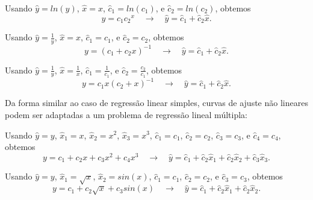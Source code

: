 \begin{example}%
Usando 
$\hat{y}=ln(y)$,  
$\hat{x}=x$, 
$\hat{c}_1=ln(c_1)$, e
$\hat{c}_2=ln(c_2)$, obtemos %
\begin{equation}
y=c_1 {c_2}^x
\quad \rightarrow \quad 
\hat{y}=\hat{c}_1+\hat{c}_2 \hat{x}.
\end{equation}
\vspace{-2pt}
\end{example}

\begin{example}%
Usando 
$\hat{y}=\frac{1}{y}$,  
$\hat{x}=x$, 
$\hat{c}_1=c_1$, e 
$\hat{c}_2=c_2$, obtemos %
\begin{equation}
y=\left(c_1 + {c_2} x \right)^{-1}
\quad \rightarrow \quad 
\hat{y}=\hat{c}_1+\hat{c}_2 \hat{x}.
\end{equation}
\vspace{-2pt}
\end{example}

\begin{example}%
Usando 
$\hat{y}=\frac{1}{y}$,  
$\hat{x}=\frac{1}{x}$, 
$\hat{c}_1=\frac{1}{c_1}$, e 
$\hat{c}_2=\frac{c_2}{c_1}$, obtemos %
\begin{equation}
y=c_1 x \left(c_2 + x\right)^{-1}
\quad \rightarrow \quad 
\hat{y}=\hat{c}_1+\hat{c}_2 \hat{x}.
\end{equation}
\vspace{-2pt}
\end{example}

Da forma similar ao caso de regressão linear simples,
curvas de ajuste não lineares podem ser adaptadas a um problema de regressão lineal múltipla:
\begin{example}%
Usando 
$\hat{y}=y$,  
$\hat{x}_1=x$,
$\hat{x}_2=x^2$,
$\hat{x}_3=x^3$, 
$\hat{c}_1=c_1$, 
$\hat{c}_2=c_2$, 
$\hat{c}_3=c_3$, e 
$\hat{c}_4=c_4$, obtemos %
\begin{equation}
y=c_1 +c_2 x + c_3 x^2 + c_4 x^3
\quad \rightarrow \quad 
\hat{y}=\hat{c}_1+\hat{c}_2 \hat{x}_1+\hat{c}_2 \hat{x}_2+\hat{c}_3 \hat{x}_3.
\end{equation}
\vspace{-2pt}
\end{example}

\begin{example}%
Usando 
$\hat{y}=y$,  
$\hat{x}_1=\sqrt{x}$,
$\hat{x}_2=sin(x)$, 
$\hat{c}_1=c_1$, 
$\hat{c}_2=c_2$, e 
$\hat{c}_3=c_3$, obtemos %
\begin{equation}
y=c_1 +c_2 \sqrt{x} + c_3 sin(x)
\quad \rightarrow \quad 
\hat{y}=\hat{c}_1+\hat{c}_2 \hat{x}_1+\hat{c}_2 \hat{x}_2.
\end{equation}
\vspace{-2pt}
\end{example}
